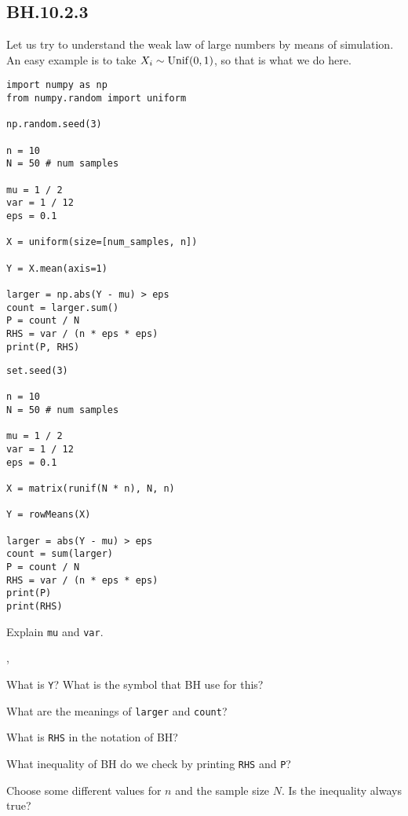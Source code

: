 


\subsection{BH.10.2.3}

Let us try to understand the weak law of large numbers by means of simulation. An easy example is to take $X_{i}\sim\mathrm{Unif}(0,1)$, so that is what we do here.

\begin{verbatim}
import numpy as np
from numpy.random import uniform

np.random.seed(3)

n = 10
N = 50 # num samples

mu = 1 / 2
var = 1 / 12
eps = 0.1

X = uniform(size=[num_samples, n])

Y = X.mean(axis=1)

larger = np.abs(Y - mu) > eps
count = larger.sum()
P = count / N
RHS = var / (n * eps * eps)
print(P, RHS)
\end{verbatim}

\begin{verbatim}
set.seed(3)

n = 10
N = 50 # num samples

mu = 1 / 2
var = 1 / 12
eps = 0.1

X = matrix(runif(N * n), N, n)

Y = rowMeans(X)

larger = abs(Y - mu) > eps
count = sum(larger)
P = count / N
RHS = var / (n * eps * eps)
print(P)
print(RHS)
\end{verbatim}


\begin{exercise}
Explain \texttt{mu} and \texttt{var}.
\end{exercise}
,
\begin{exercise}
What is \texttt{Y}? What is the symbol that BH use for this?
\end{exercise}

\begin{exercise}
What are the meanings of \texttt{larger} and \texttt{count}?
\end{exercise}

\begin{exercise}
What is \texttt{RHS} in the notation of BH?
\end{exercise}

\begin{exercise}
What inequality of BH do we check by printing \texttt{RHS}  and \texttt{P}?
\end{exercise}

\begin{exercise}
Choose some different values for $n$ and the sample size $N$. Is the inequality always true?
\end{exercise}


